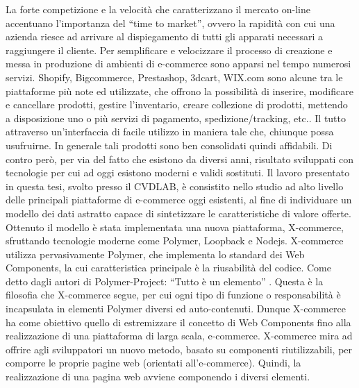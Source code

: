 \newline
La forte competizione e la velocità che caratterizzano il mercato on-line accentuano l’importanza del “time to market”, ovvero la rapidità con cui una azienda riesce ad arrivare al dispiegamento di tutti gli apparati necessari a raggiungere il cliente.
\newline
Per semplificare e velocizzare il processo di creazione e messa in produzione di ambienti di e-commerce sono apparsi nel tempo numerosi servizi.
\newline
Shopify, Bigcommerce, Prestashop, 3dcart, WIX.com sono alcune tra le piattaforme più note ed utilizzate, che offrono la possibilità di inserire, modificare e cancellare prodotti, gestire l’inventario, creare collezione di prodotti, mettendo a disposizione uno o più servizi di pagamento, spedizione/tracking, etc.. Il tutto attraverso un’interfaccia di facile utilizzo in maniera tale che, chiunque possa usufruirne.
\newline
In generale tali prodotti sono ben consolidati quindi affidabili. Di contro però, per via del fatto che esistono da diversi anni, risultato sviluppati con tecnologie per cui ad oggi esistono moderni e validi sostituti.
\newline
Il lavoro presentato in questa tesi, svolto presso il CVDLAB, è consistito nello studio ad alto livello delle principali piattaforme di e-commerce oggi esistenti, al fine di individuare un modello dei dati astratto capace di sintetizzare le caratteristiche di valore offerte.
Ottenuto il modello è stata implementata una nuova piattaforma, X-commerce, sfruttando
tecnologie moderne come Polymer, Loopback e Nodejs.
\newline
X-commerce utilizza pervasivamente Polymer, che implementa lo standard dei Web Components, la cui caratteristica principale è la riusabilità del codice.
Come detto dagli autori di Polymer-Project: “Tutto è un elemento” \cite{polymer_world_view}. Questa è la filosofia che X-commerce segue, per cui ogni tipo di funzione o responsabilità è incapsulata in elementi Polymer diversi ed auto-contenuti.
Dunque X-commerce ha come obiettivo  quello di estremizzare il concetto di Web Components fino alla realizzazione di una piattaforma di larga scala, e-commerce.
\newline
X-commerce mira ad offrire agli sviluppatori un nuovo metodo, basato su componenti riutilizzabili, per comporre le proprie pagine web (orientati all’e-commerce). Quindi, la realizzazione di una pagina web avviene componendo i diversi elementi.
\newline
